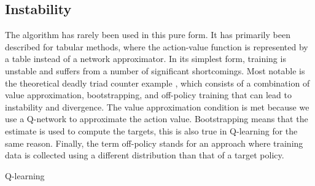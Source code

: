 \subsection*{Instability}
The algorithm has rarely been used in this pure form. 
It has primarily been described for tabular methods, where the action-value function is represented by a table instead of a network approximator.
In its simplest form, training is unstable and suffers from a number of significant shortcomings.
Most notable is the theoretical deadly triad counter example \cite{sutton2018reinforcement}, which consists of a combination of value approximation, bootstrapping, and off-policy training that can lead to instability and divergence.
The value approximation condition is met because we use a Q-network to approximate the action value.
Bootstrapping means that the estimate is used to compute the targets, this is also true in Q-learning for the same reason.
Finally, the term off-policy stands for an approach where training data is collected using a different distribution than that of a target policy.





\begin{algorithm}
  \caption{Q-learning}
  \label{Qlearning}
\end{algorithm}






